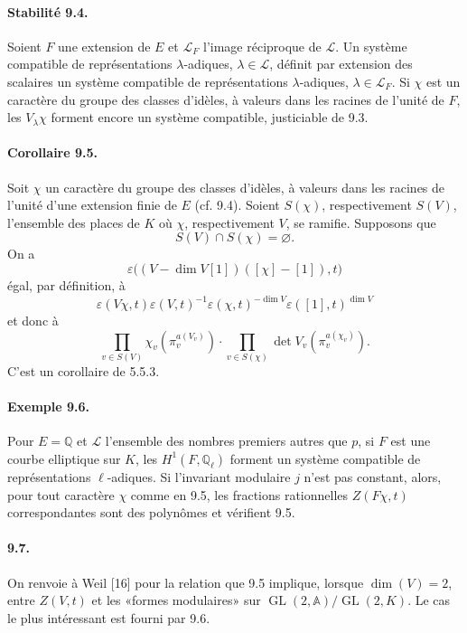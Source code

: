 \documentclass[10pt,letterpaper]{article}
\newcommand{\Q}{\mathbb Q}
\newcommand{\GL}{\operatorname{GL}}
\providecommand{\GL}{\operatorname{GL}}
\providecommand{\LLL}{\mathcal L}
\providecommand{\GL}{\operatorname{GL}}
\begin{document}
\paragraph{Stabilité 9.4.} Soient $F$ une extension de $E$ et $\LLL_F$ l'image réciproque de $\LLL$. Un système compatible de représentations $\lambda$-adiques, $\lambda\in\LLL$, définit par extension des scalaires un système compatible de représentations $\lambda$-adiques, $\lambda\in\LLL_F$. Si $\chi$ est un caractère du groupe des classes d'idèles, à valeurs dans les racines de l'unité de $F$, les $V_\lambda\chi$ forment encore un système compatible, justiciable de 9.3.

\paragraph{Corollaire 9.5.} Soit $\chi$ un caractère du groupe des classes d'idèles, à valeurs dans les racines de l'unité d'une extension finie de $E$ (cf. 9.4). Soient $S(\chi)$, respectivement $S(V)$, l'ensemble des places de $K$ où $\chi$, respectivement $V$, se ramifie. Supposons que
\[
S(V)\cap S(\chi)=\varnothing.
\]
On a
\[
\varepsilon\bigl((V-\dim V[1])([\chi]-[1]),t\bigr)
\]
égal, par définition, à
\[
\varepsilon(V\chi,t)\varepsilon(V,t)^{-1}
\varepsilon(\chi,t)^{-\dim V}\varepsilon([1],t)^{\dim V}
\]
et donc à
\[
\prod_{v\in S(V)}\chi_v(\pi_v^{a(V_v)})
\cdot
\prod_{v\in S(\chi)}\det V_v(\pi_v^{a(\chi_v)}).
\]
C'est un corollaire de 5.5.3.

\paragraph{Exemple 9.6.} Pour $E=\Q$ et $\LLL$ l'ensemble des nombres premiers autres que $p$, si $F$ est une courbe elliptique sur $K$, les $H^1(F,\Q_\ell)$ forment un système compatible de représentations $\ell$-adiques. Si l'invariant modulaire $j$ n'est pas constant, alors, pour tout caractère $\chi$ comme en 9.5, les fractions rationnelles $Z(F\chi,t)$ correspondantes sont des polynômes et vérifient 9.5.

\paragraph{9.7.} On renvoie à Weil [16] pour la relation que 9.5 implique, lorsque $\dim(V)=2$, entre $Z(V,t)$ et les «formes modulaires» sur $\GL(2,\mathbb A)/\GL(2,K)$. Le cas le plus intéressant est fourni par 9.6.
\end{document}
